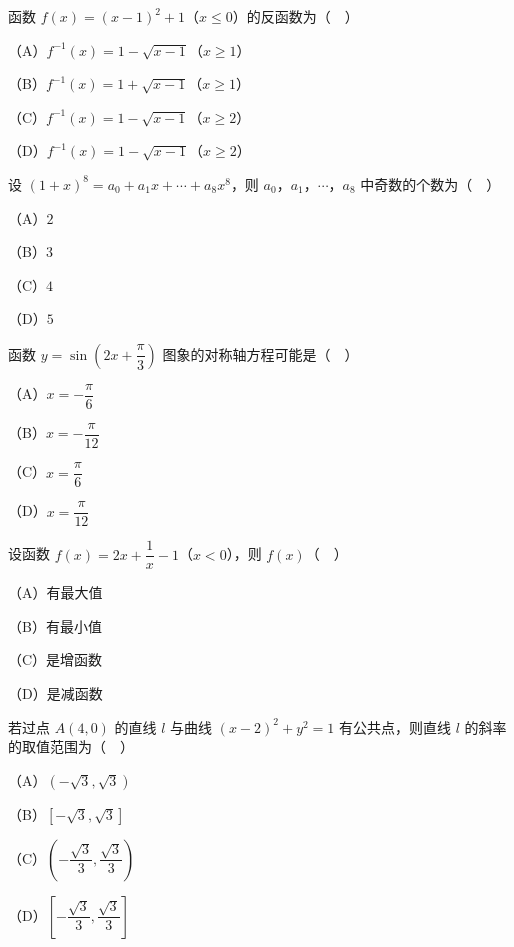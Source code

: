 \begin{question}
函数 $f(x)=(x-1)^2+1$（$x\leqslant0$）的反函数为（　）

（A）$f^{-1}(x)=1-\sqrt{x-1}$（$x\geqslant1$）

（B）$f^{-1}(x)=1+\sqrt{x-1}$（$x\geqslant1$）

（C）$f^{-1}(x)=1-\sqrt{x-1}$（$x\geqslant2$）

（D）$f^{-1}(x)=1-\sqrt{x-1}$（$x\geqslant2$）

\end{question}
\begin{question}
设 $(1+x)^8=a_0+a_1x+\cdots+a_8x^8$，则 $a_0$，$a_1$，$\cdots$，$a_8$ 中奇数的个数为（　）

（A）$2$

（B）$3$

（C）$4$

（D）$5$

\end{question}
\begin{question}
函数 $y=\sin\left(2x+\dfrac{\pi}{3}\right)$ 图象的对称轴方程可能是（　）

（A）$x=-\dfrac{\pi}{6}$

（B）$x=-\dfrac{\pi}{12}$

（C）$x=\dfrac{\pi}{6}$

（D）$x=\dfrac{\pi}{12}$

\end{question}
\begin{question}
设函数 $f(x)=2x+\dfrac1x-1$（$x<0$），则 $f(x)$（　）

（A）有最大值

（B）有最小值

（C）是增函数

（D）是减函数

\end{question}
\begingroup
\renewenvironment{question}{\Needspace{0.46\textheight}}{}
\begin{question}
若过点 $A(4,0)$ 的直线 $l$ 与曲线 $(x-2)^2+y^2=1$ 有公共点，则直线 $l$ 的斜率的取值范围为（　）

（A）$(-\sqrt3,\sqrt3)$

（B）$[-\sqrt3,\sqrt3]$

（C）$\left(-\dfrac{\sqrt3}{3},\dfrac{\sqrt3}{3}\right)$

（D）$\left[-\dfrac{\sqrt3}{3},\dfrac{\sqrt3}{3}\right]$

\end{question}

